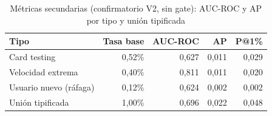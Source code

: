 \begin{table}[htbp]
\centering
\small
\caption{Métricas secundarias (confirmatorio V2, sin gate): AUC-ROC y AP por tipo y unión tipificada}
\label{tab:v2-secondary-metrics}
\begin{tabular}{lrrrr}
\toprule
Tipo & Tasa base & AUC-ROC & AP & P@1\% \\
\midrule
  Card testing & 0,52\% & 0,627 & 0,011 & 0,029 \\
  Velocidad extrema & 0,40\% & 0,811 & 0,011 & 0,020 \\
  Usuario nuevo (ráfaga) & 0,12\% & 0,624 & 0,002 & 0,002 \\
  Unión tipificada & 1,00\% & 0,696 & 0,022 & 0,048 \\
\bottomrule
\end{tabular}
\end{table}
